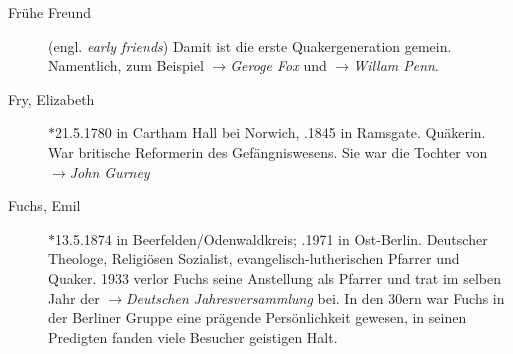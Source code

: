 \begin{description}
 \item[Frühe Freund] (engl. \textit{early friends}) Damit ist die erste
 Quakergeneration gemein. Namentlich, zum Beispiel $\to$\textit{Geroge Fox}
 und $\to$\textit{Willam Penn}.

 \item[Fry, Elizabeth] $\ast$21.5.1780 in Cartham Hall bei Norwich,
 .1845 in Ramsgate. Quäkerin. War britische Reformerin des
 Gefängniswesens. Sie war die Tochter von $\to$\textit{John Gurney}

 \item[Fuchs, Emil] $\ast$13.5.1874 in Beerfelden/Odenwaldkreis; .1971
 in Ost-Berlin. Deutscher Theologe, Religiösen Sozialist,
 evangelisch-lutherischen Pfarrer und Quaker. 1933 verlor Fuchs seine
 Anstellung als Pfarrer und trat im selben Jahr der $\to$\textit{Deutschen
 Jahresversammlung} bei. In den 30ern war Fuchs in der Berliner Gruppe eine
 prägende Persönlichkeit gewesen, in seinen Predigten fanden viele Besucher
 geistigen Halt.


 \end{description}

\normalsize